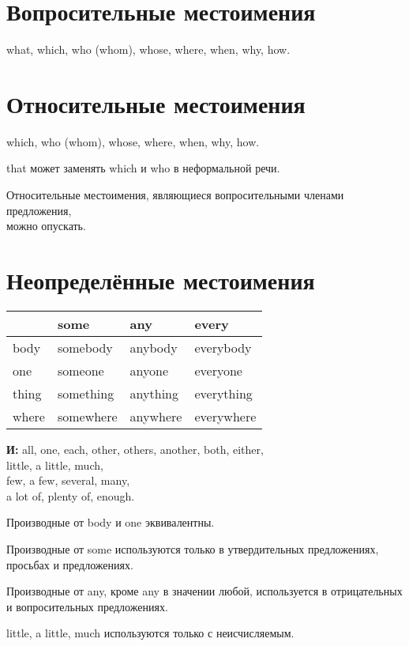\documentclass[oneside]{book}
\begin{document}
\section{Вопросительные местоимения}
what, which, who (whom), whose,
where, when, why, how.

\section{Относительные местоимения}
which, who (whom), whose,
where, when, why, how.

that может заменять which и who в неформальной речи.

Относительные местоимения, являющиеся вопросительными членами предложения, \\
можно опускать.

\section{Неопределённые местоимения}
\begin{center}
    \begin{tabular}{|l|l|l|l|}
    \hline
          & some      & any      & every      \\ \hline
    body  & somebody  & anybody  & everybody  \\ \hline
    one   & someone   & anyone   & everyone   \\ \hline
    thing & something & anything & everything \\ \hline
    where & somewhere & anywhere & everywhere \\ \hline
    \end{tabular}
\end{center}

\textbf{И:} all, one, each, other, others, another,
both, either,
\\
little, a little, much,
\\
few, a few, several, many,
\\
a lot of, plenty of, enough.

Производные от body и one эквивалентны.

Производные от some используются только в утвердительных предложениях, \\
просьбах и предложениях.

Производные от any, кроме any в значении любой, используется в отрицательных
и вопросительных предложениях.

little, a little, much используются только с неисчисляемым.
\end{document}
